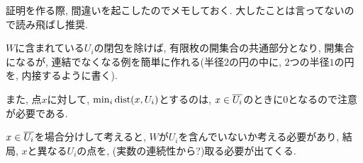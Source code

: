 \documentclass[../main]{subfiles}
\begin{document}
証明を作る際, 間違いを起こしたのでメモしておく.
大したことは言ってないので読み飛ばし推奨.
\begin{memo*}
  $W$に含まれている$U_i$の閉包を除けば, 有限枚の開集合の共通部分となり, 開集合になるが,
  連結でなくなる例を簡単に作れる(半径$2$の円の中に, $2$つの半径$1$の円を, 内接するように書く).

  また, 点$x$に対して, $\min_i \mathrm{dist}(x,U_i)$とするのは,
  $x\in{\overline{U_i}}$のときに$0$となるので注意が必要である.

  $x\in{\overline{U_i}}$を場合分けして考えると,
  $W$が$U_i$を含んでいないか考える必要があり,
  結局, $x$と異なる$U_i$の点を,
  (実数の連続性から?)取る必要が出てくる.
\end{memo*}
\end{document}
